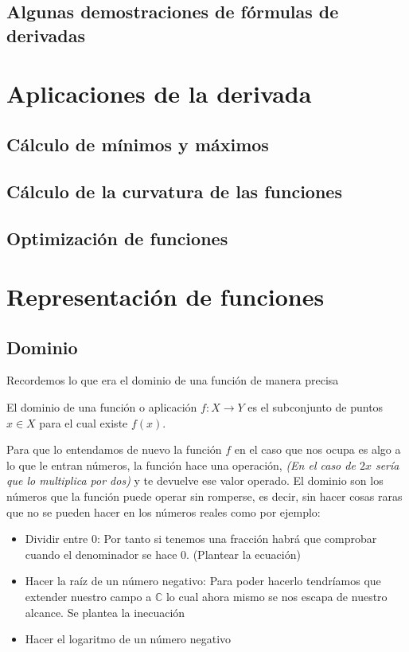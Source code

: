 \newpage
\section{Algunas demostraciones de fórmulas de derivadas}









\chapter{Aplicaciones de la derivada}
\minitoc

\newpage
\section{Cálculo de mínimos y máximos}
\section{Cálculo de la curvatura de las funciones}
\section{Optimización de funciones}






\chapter{Representación de funciones}
\minitoc

\newpage
\section{Dominio}
Recordemos lo que era el dominio de una función de manera precisa
\begin{defi}
El dominio de una función o aplicación $f: X\longrightarrow Y$ es el subconjunto de puntos $x \in X$ para el cual existe $f(x)$. 
\end{defi}
\noindent
Para que lo entendamos de nuevo la función $f$ en el caso que nos ocupa es algo a lo que le entran números, la función hace una operación, \emph{(En el caso de $2x$ sería que lo multiplica por dos)} y te devuelve ese valor operado. 
\noindent
El dominio son los números que la función puede operar sin  romperse, es decir, sin hacer cosas raras que no se pueden hacer en los números reales como por ejemplo:
\begin{itemize}
\item Dividir entre 0: Por tanto si tenemos una fracción habrá que comprobar cuando el denominador se hace 0. (Plantear la ecuación)
\item Hacer la raíz de un número negativo: Para poder hacerlo tendríamos que extender nuestro campo a $\mathbb{C}$ lo cual ahora mismo se nos escapa de nuestro alcance. Se plantea la inecuación
\item Hacer el logaritmo de un número negativo 
\end{itemize}

